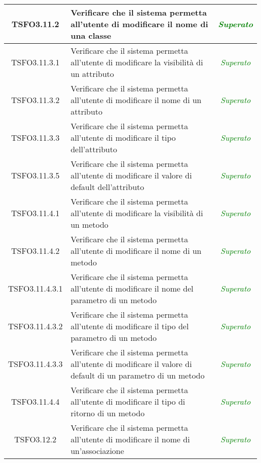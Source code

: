 \begin{longtable}{|c|>{}m{8cm}|c|}
\hypertarget{TSFO3.11.2}{TSFO3.11.2} & Verificare che il sistema permetta all'utente di modificare il nome di una classe & \textcolor{Green}{\textit{Superato}}\\ \hline
\hypertarget{TSFO3.11.3.1}{TSFO3.11.3.1} & Verificare che il sistema permetta all'utente di modificare la visibilità di un attributo & \textcolor{Green}{\textit{Superato}}\\ \hline
\hypertarget{TSFO3.11.3.2}{TSFO3.11.3.2} & Verificare che il sistema permetta all'utente di modificare il nome di un attributo & \textcolor{Green}{\textit{Superato}}\\ \hline
\hypertarget{TSFO3.11.3.3}{TSFO3.11.3.3} & Verificare che il sistema permetta all'utente di modificare il tipo dell'attributo & \textcolor{Green}{\textit{Superato}}\\ \hline
\hypertarget{TSFO3.11.3.5}{TSFO3.11.3.5} & Verificare che il sistema permetta all'utente di modificare il valore di default dell'attributo & \textcolor{Green}{\textit{Superato}}\\ \hline
\hypertarget{TSFO3.11.4.1}{TSFO3.11.4.1} & Verificare che il sistema permetta all'utente di modificare la visibilità di un metodo & \textcolor{Green}{\textit{Superato}}\\ \hline
\hypertarget{TSFO3.11.4.2}{TSFO3.11.4.2} & Verificare che il sistema permetta all'utente di modificare il nome di un metodo & \textcolor{Green}{\textit{Superato}}\\ \hline
\hypertarget{TSFO3.11.4.3.1}{TSFO3.11.4.3.1} & Verificare che il sistema permetta all'utente di modificare il nome del parametro di un metodo & \textcolor{Green}{\textit{Superato}}\\ \hline
\hypertarget{TSFO3.11.4.3.2}{TSFO3.11.4.3.2} & Verificare che il sistema permetta all'utente di modificare il tipo del parametro di un metodo & \textcolor{Green}{\textit{Superato}}\\ \hline
\hypertarget{TSFO3.11.4.3.3}{TSFO3.11.4.3.3} & Verificare che il sistema permetta all'utente di modificare il valore di default di un parametro di un metodo & \textcolor{Green}{\textit{Superato}}\\ \hline
\hypertarget{TSFO3.11.4.4}{TSFO3.11.4.4} & Verificare che il sistema permetta all'utente di modificare il tipo di ritorno di un metodo & \textcolor{Green}{\textit{Superato}}\\ \hline
\hypertarget{TSFO3.12.2}{TSFO3.12.2} & Verificare che il sistema permetta all'utente di modificare il nome di un'associazione & \textcolor{Green}{\textit{Superato}}\\ \hline

\end{longtable}
